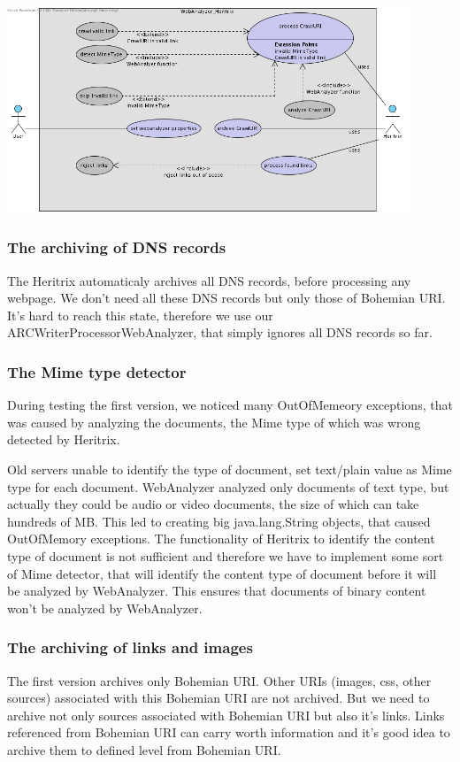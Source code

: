 \documentclass[11pt,a4paper]{article}
\begin{document}
\includegraphics[width=120mm]{usecase1.png}

\subsubsection{The archiving of DNS records}
The Heritrix automaticaly archives all DNS records, before processing any webpage. We don't need all these DNS records but only those of Bohemian URI. It's hard to reach this state, therefore we use our ARCWriterProcessorWebAnalyzer, that simply ignores all DNS records so far.

\subsubsection{The Mime type detector}
During testing the first version, we noticed many OutOfMemeory exceptions, that was caused by analyzing the documents, the Mime type of which was wrong detected by Heritrix.

Old servers unable to identify the type of document, set text/plain value as Mime type for each document. WebAnalyzer analyzed only documents of text type, but actually they could be audio or video documents, the size of which can take hundreds of MB. This led to creating big java.lang.String objects, that caused OutOfMemory exceptions. The functionality of Heritrix to identify the content type of document is not sufficient and therefore we have to implement some sort of Mime detector, that will identify the content type of document before it will be analyzed by WebAnalyzer. This ensures that documents of binary content won't be analyzed by WebAnalyzer.

\subsubsection{The archiving of links and images}
The first version archives only Bohemian URI. Other URIs (images, css, other sources) associated with this Bohemian URI are not archived. But we need to archive not only sources associated with Bohemian URI but also it's links. Links referenced from Bohemian URI can carry worth information and it's good idea to archive them to defined level from Bohemian URI.
\end{document}
